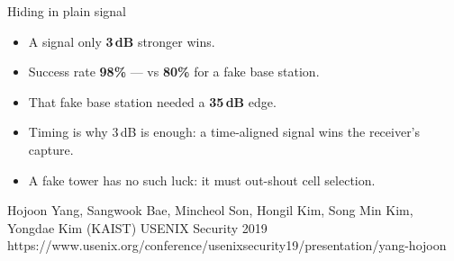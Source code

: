 \begin{frame}{Hiding in plain signal}
  \vspace{0.2em}
  \small
  \begin{itemize}\itemsep5pt
    \item A signal only \textbf{3\,dB}  stronger wins.
    \item Success rate \textbf{98\%} --- vs \textbf{80\%} for a fake base station.
    \item That fake base station needed a \textbf{35\,dB}  edge.
    \item Timing is why 3\,dB is enough: a time-aligned signal wins the receiver's capture.
    \item A fake tower has no such luck: it must out-shout cell selection.
  \end{itemize}


    {Hojoon Yang, Sangwook Bae, Mincheol Son, Hongil Kim, Song Min Kim, Yongdae Kim (KAIST)}
    {USENIX Security 2019}
    {https://www.usenix.org/conference/usenixsecurity19/presentation/yang-hojoon}

\end{frame}


